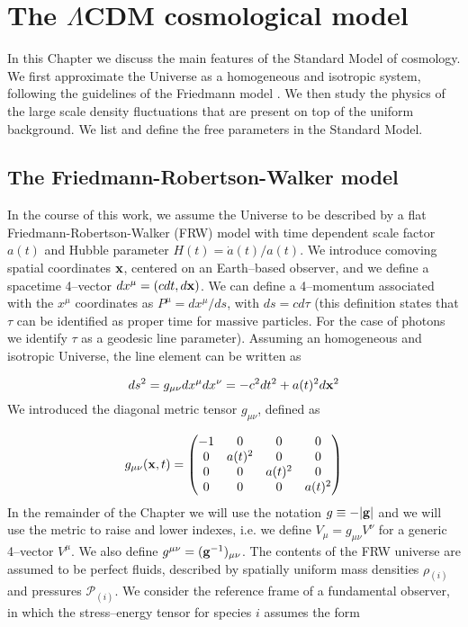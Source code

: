 
\chapter{The $\Lambda$CDM cosmological model}
 \thispagestyle{fancyplain}
\setlength{\parindent}{10mm}
\label{chp:1}

In this Chapter we discuss the main features of the Standard Model of cosmology. We first approximate the Universe as a homogeneous and isotropic system, following the guidelines of the Friedmann model \citep{Friedman1922}. We then study the physics of the large scale density fluctuations that are present on top of the uniform background. We list and define the free parameters in the Standard Model. 

\section{The Friedmann-Robertson-Walker model}
In the course of this work, we assume the Universe to be described by a flat Friedmann-Robertson-Walker (FRW) model with time dependent scale factor $a(t)$ and Hubble parameter $H(t)=\dot{a}(t)/a(t)$. We introduce comoving spatial coordinates $\mathbf{x}$, centered on an Earth--based observer, and we define a spacetime 4--vector $dx^{\mu}=(cdt,d\mathbf{x})$. We can define a 4--momentum associated with the $x^\mu$ coordinates as $P^\mu=dx^\mu/ds$, with $ds=cd\tau$ (this definition states that $\tau$ can be identified as proper time for massive particles. For the case of photons we identify $\tau$ as a geodesic line parameter). Assuming an homogeneous and isotropic Universe, the line element can be written as  

\begin{equation}
\label{eq:1:frw}
ds^2 = g_{\mu\nu}dx^\mu dx^\nu = -c^2dt^2 + a(t)^2d\mathbf{x}^2
\end{equation}
%
We introduced the diagonal metric tensor $g_{\mu\nu}$, defined as 

\begin{equation}
\label{eq:1:metric}
g_{\mu\nu}(\mathbf{x},t) = 
\begin{pmatrix}
-1 & 0 & 0 & 0 \\
0 & a(t)^2 & 0 & 0 \\
0 & 0 & a(t)^2 & 0 \\
0 & 0 & 0 & a(t)^2 
\end{pmatrix}
\end{equation}
%
In the remainder of the Chapter we will use the notation $g\equiv-\vert\mathbf{g}\vert$ and we will use the metric to raise and lower indexes, i.e. we define $V_\mu = g_{\mu\nu}V^\nu$ for a generic 4--vector $V^\mu$. We also define $g^{\mu\nu}=(\mathbf{g}^{-1})_{\mu\nu}$.
The contents of the FRW universe are assumed to be perfect fluids, described by spatially uniform mass densities $\rho_{(i)}$ and pressures $\mathcal{P}_{(i)}$. We consider the reference frame of a fundamental observer, in which the stress--energy tensor for species $i$ assumes the form 


